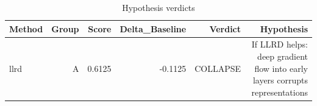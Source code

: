 \begin{table}[htbp]
\centering
\caption{Hypothesis verdicts}
\label{tab:hyp-verdicts}
\begin{tabular}{lrrrrr}
\toprule
\textbf{Method} & \textbf{Group} & \textbf{Score} & \textbf{Delta\_Baseline} & \textbf{Verdict} & \textbf{Hypothesis} \\
\midrule
llrd & A & 0.6125 & -0.1125 & COLLAPSE & If LLRD helps: deep gradient flow into early layers corrupts representations \\
\bottomrule
\end{tabular}
\end{table}